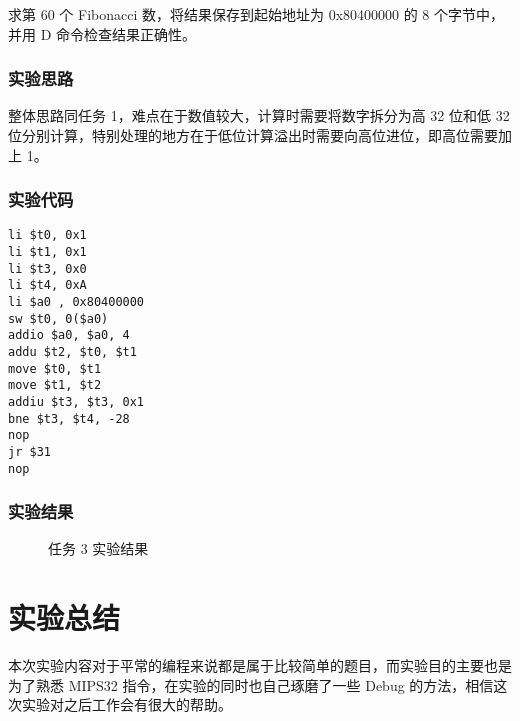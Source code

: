 \documentclass[a4paper]{article}
\begin{document}
            求第 60 个 Fibonacci 数，将结果保存到起始地址为 0x80400000 的 8 个字节中，并用 D 命令检查结果正确性。
        
        \subsubsection{实验思路}

            整体思路同任务 1，难点在于数值较大，计算时需要将数字拆分为高 32 位和低 32 位分别计算，特别处理的地方在于低位计算溢出时需要向高位进位，即高位需要加上 1。
        
        \subsubsection{实验代码}

            \begin{lstlisting}
li $t0, 0x1
li $t1, 0x1
li $t3, 0x0
li $t4, 0xA
li $a0 , 0x80400000
sw $t0, 0($a0)
addio $a0, $a0, 4
addu $t2, $t0, $t1
move $t0, $t1
move $t1, $t2
addiu $t3, $t3, 0x1
bne $t3, $t4, -28
nop
jr $31
nop
            \end{lstlisting}
            
        \subsubsection{实验结果}

            \begin{figure}[H]
                \centering
                \caption{任务 3 实验结果}
            \end{figure}

        \newpage

\section{实验总结}
    
    本次实验内容对于平常的编程来说都是属于比较简单的题目，而实验目的主要也是为了熟悉 MIPS32 指令，在实验的同时也自己琢磨了一些 Debug 的方法，相信这次实验对之后工作会有很大的帮助。
\end{document}
